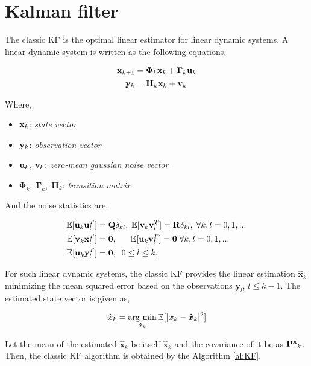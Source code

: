 \section{Kalman filter\label{sec: kf}}

The classic KF is the optimal linear estimator for linear dynamic systems. A linear dynamic system is written as the following equations.

\begin{align}
{\bf x}_{k+1} &= \bm{\Phi}_k{\bf x}_{k} + \bm{\Gamma}_k{\bf u}_{k} \label{eq:linear1}\\
{\bf y}_{k} &= {\bf H}_k{\bf x}_{k} + {\bf v}_{k} \label{eq:linear2}
\end{align}

Where, 
\begin{itemize}
    \item ${\bf x}_k$: {\it state vector}
    \item ${\bf y}_k$: {\it observation vector}
    \item ${\bf u}_k$, ${\bf v}_k$: {\it zero-mean gaussian noise vector}
    \item $\bm{\Phi}_k, \; \bm{\Gamma}_k, \; \bm{H}_k$: {\it transition matrix}
\end{itemize}

And the noise statistics are,

\begin{align}
    \mathbb{E}[{\bf u}_k{\bf u}_l^T]&={\bf Q}\delta_{kl},\;
    \mathbb{E}[{\bf v}_k{\bf v}_l^T]={\bf R}\delta_{kl},\; \forall k,l=0,1,...\\
    \mathbb{E}[{\bf v}_k{\bf x}_l^T]&={\bf 0},\;\;\;\;\;\;
    \mathbb{E}[{\bf u}_k{\bf v}_l^T]={\bf 0}\; \forall k,l=0,1,...\\
    \mathbb{E}[{\bf u}_k{\bf y}_l^T]&={\bf 0}, \;\; 0\leq l\leq k,
\end{align}

For such linear dynamic systems, the classic KF provides the linear estimation $\bm{\hat x}_k$ minimizing the mean squared error based on the observations $\bm{y}_l$, $l\leq k-1$. The estimated state vector is given as,

\begin{equation} \label{eq:cost}
    \bm{\hat x}_k = \mathop{\rm arg~min}\limits_{\bm{\hat x}_k}\mathbb{E}[|\bm{x}_k-\bm{\hat x}_k|^2]
\end{equation}

Let the mean of the estimated $\bm{\hat x}_k$ be itself $\bm{\hat x}_k$ and the covariance of it be as ${\bf P^x}_{k}$. Then, the classic KF algorithm is obtained by the Algorithm \ref{al:KF}.

